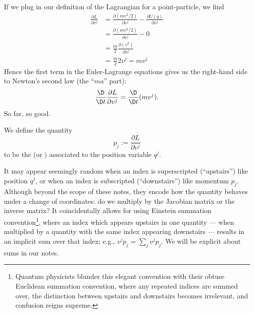 \M
If we plug in our definition of the Lagrangian for a point-particle, we
find
\begin{subequations}
\begin{align}
\frac{\partial L}{\partial v^{j}}
&= \frac{\partial (mv^{2}/2)}{\partial v^{j}} - \frac{\partial U(q)}{\partial v^{j}}\\
&= \frac{\partial (mv^{2}/2)}{\partial v^{j}} - 0\\
&= \frac{m}{2}\frac{\partial (v^{2})}{\partial v^{j}}\\
&= \frac{m}{2}2 v^{j} = mv^{j}
\end{align}
\end{subequations}
Hence the first term in the Euler-Lagrange equations gives us the
right-hand side to Newton's second law (the ``$ma$'' part):
\begin{equation}
\frac{\D}{\D t}\frac{\partial L}{\partial v^{j}} =
\frac{\D}{\D t}(m v^{j}).
\end{equation}
So far, so good.

\begin{remark}
We define the quantity
\begin{equation}
p_{j} := \frac{\partial L}{\partial v^{j}}
\end{equation}
to be the  (or )
associated to the position variable $q^{j}$.
\end{remark}

\begin{remark}
It may appear seemingly random when an index is superscripted
(``upstairs'') like position $q^{j}$, or when an index is subscripted
(``downstairs'') like momentum $p_{j}$. Although beyond the scope of
these notes, they encode how the quantity behaves under a change of
coordinates: do we multiply by the Jacobian matrix or the inverse matrix?
It coincidentally allows for using Einstein summation
convention\footnote{Quantum physicists blunder this elegant convention
with their obtuse Euclidean summation convention, where any repeated
indices are summed over, the distinction between upstairs and downstairs
becomes irrelevant, and confusion reigns supreme.}, where
an index which appears upstairs in one quantity --- when multiplied by a
quantity with the same index appearing downstairs --- results in an
implicit sum over that index; e.g., $v^{j}p_{j} = \sum_{j}v^{j}p_{j}$.
We will be explicit about sums in our notes.
\end{remark}

